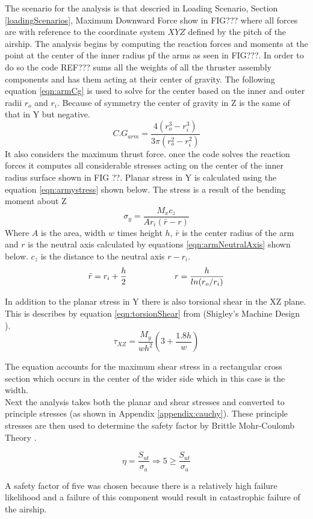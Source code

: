 \documentclass[../main.tex]{subfiles}
\begin{document}
The scenario for the analysis is that descried in Loading Scenario, Section \ref{loadingScenarios}, Maximum Downward Force show in FIG??? where all forces are with reference to the coordinate system $XYZ$ defined by the pitch of the airship. The analysis begins by computing the reaction forces and moments at the point at the center of the inner radius pf the arms as seen in FIG???. In order to do so the code REF??? sums all the weights of all the thruster assembly components and has them acting at their center of gravity. The following equation \ref{eqn:armCg} is used to solve for the center based on the inner and outer radii $r_o$ and $r_i$. Because of symmetry the center of gravity in Z is the same of that in Y but negative. 
\begin{equation} \label{eqn:armCg}
C.G_{arm} =\frac{4(r_o^3 - r_i^3)}{3\pi(r_o^2 - r_i^2)}
\end{equation}
It also considers the maximum thrust force. once the code solves the reaction forces it computes all considerable stresses acting on the center of the inner radius surface shown in FIG ??. Planar stress in Y is calculated using the equation \ref{eqn:armystress} shown below. The stress is a result of the bending moment about Z
\begin{equation}
\label{eqn:armystress}
\sigma_{y}= \frac{M_{x}c_z}{A r_i (\bar{r} - r)}
\end{equation}
Where $A$ is the area, width $w$ times height $h$, $\bar{r}$ is the center radius of the arm and $r$ is the neutral axis calculated by equations \ref{eqn:armNeutralAxis} shown below. $c_z$ is the distance to the neutral axis $r - r_i$.
\begin{equation} \label{eqn:armNeutralAxis}
\bar{r} = r_i + \frac{h}{2} \hspace{20mm}  r = \frac{h}{ln(r_o/r_i)}
\end{equation}

In addition to the planar stress in Y there is also torsional shear in the XZ plane. This is describes by equation \ref{eqn:torsionShear} from {(Shigley's Machine Design \cite[102]{shigley})}.
\begin{equation} \label{eqn:torsionShear}
\tau_{XZ} = \dfrac{M_{y}}{wh^2}(3+\frac{1.8h}{w})
\end{equation}

The equation accounts for the maximum shear stress in a rectangular cross section which occurs in the center of the wider side which in this case is the width. \\ 

Next the analysis takes both the planar and shear stresses and converted to principle stresses (as shown in Appendix \ref{appendix:cauchy}). These principle stresses are then used to determine the safety factor by Brittle Mohr-Coulomb Theory \cite[227]{shigley}.

\begin{equation}
\eta = \dfrac{S_{ut}}{\sigma _a} \Rightarrow 5 \geq \dfrac{S_{ut}}{\sigma _a}
\end{equation}

A safety factor of five was chosen because there is a relatively high failure likelihood and a failure of this component would result in catastrophic failure of the airship.
\end{document}
